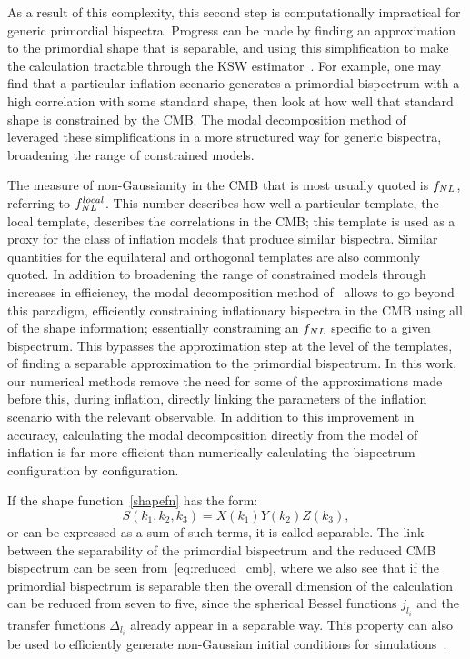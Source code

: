 As a result of this complexity, this second step is computationally impractical for generic primordial bispectra.
Progress can be made by finding an approximation to the primordial shape
that is separable, and using this simplification
to make the calculation tractable
through the KSW estimator~\cite{Komatsu_2005, Munchmeyer_2014}.
For example, one may find that a particular inflation scenario generates
a primordial bispectrum with a high correlation with some standard shape,
then look at how well that standard shape is constrained by the CMB.
The modal decomposition method of~\cite{FergShell_1,FergShell_2,FergShell_3}
leveraged these simplifications in a more structured way
for generic bispectra, broadening the range of constrained models.


The measure of non-Gaussianity in the CMB that is
most usually quoted is $f_{NL}$, referring to $f^{local}_{NL}$.
This number describes how well a particular template, the local template,
describes the correlations in the CMB;
this template is used as a proxy for the class of inflation models that produce similar bispectra.
Similar quantities for the equilateral and orthogonal templates are also
commonly quoted.
In addition to broadening the range of constrained models through increases in efficiency,
the modal decomposition method of~\cite{FergShell_1,FergShell_2,FergShell_3}
allows to go beyond this paradigm, efficiently constraining inflationary bispectra in the CMB using
all of the shape information; essentially constraining an $f_{NL}$
specific to a given bispectrum. This bypasses the approximation step at the level of the templates,
of finding a separable approximation to the primordial bispectrum.
In this work, our numerical methods remove the need for some of the approximations
made before this, during inflation, directly linking the parameters of the inflation scenario
with the relevant observable.
In addition to this improvement in accuracy, calculating the modal decomposition
directly from the model of inflation is far more efficient 
than numerically calculating the bispectrum configuration by configuration.


If the shape function~\eqref{shapefn} has the form:
\begin{equation}\label{sepXYZ}
S(k_1,k_2,k_3) = X(k_1)Y(k_2)Z(k_3),
\end{equation}
or can be expressed as a sum of such terms,
it is called separable.
The link between the separability of the primordial bispectrum
and the reduced CMB bispectrum can be seen from~\eqref{eq:reduced_cmb},
where we also see that if the primordial bispectrum is separable
then the overall dimension
of the calculation can be reduced from seven to five, 
since the spherical Bessel functions $j_{l_i}$ and the
transfer functions $\Delta_{l_i}$ already appear in a separable way.
This property can also be used to
efficiently generate non-Gaussian initial conditions
for simulations~\cite{Scoccimarro_2012}.


